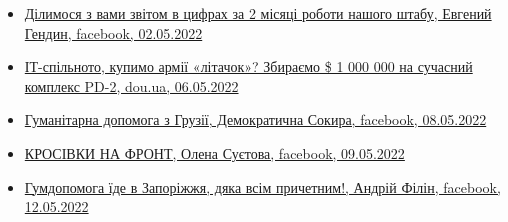 \begin{itemize}
\item \hyperlink{02_05_2022.fb.gendin_evgenij.dnepropetrovsk.1.zvit}{%
Ділимося з вами звітом в цифрах за 2 місяці роботи нашого штабу, Евгений Гендин, facebook, 02.05.2022%
}

\item \hyperlink{06_05_2022.stz.pc.ua.dou.1.litachok}{%
ІТ-спільното, купимо армії «літачок»? Збираємо \$ 1 000 000 на сучасний комплекс PD-2, dou.ua, 06.05.2022%
}

\item \hyperlink{08_05_2022.fb.demsokyra.1.gumdopomoga_gruzia}{%
Гуманітарна допомога з Грузії, Демократична Сокира, facebook, 08.05.2022
}

\item \hyperlink{09_05_2022.fb.suetova_olena.kiev.1.krosivky_na_front}{%
КРОСІВКИ НА ФРОНТ, Олена Суєтова, facebook, 09.05.2022%
}

\item \hyperlink{12_05_2022.fb.filin_andrej.kiev.1.gumdopomoga}{%
Гумдопомога їде в Запоріжжя, дяка всім причетним!, Андрій Філін, facebook, 12.05.2022%
}

\end{itemize} %
